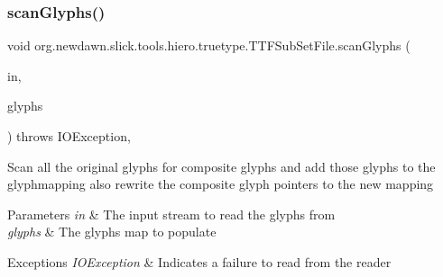 \mbox{\label{classorg_1_1newdawn_1_1slick_1_1tools_1_1hiero_1_1truetype_1_1_t_t_f_sub_set_file_ac6b4665aa19603c6718a9153d3bcab5c}} 
\subsubsection{\texorpdfstring{scan\+Glyphs()}{scanGlyphs()}}
{\footnotesize\ttfamily void org.\+newdawn.\+slick.\+tools.\+hiero.\+truetype.\+T\+T\+F\+Sub\+Set\+File.\+scan\+Glyphs (\begin{DoxyParamCaption}\item[{\mbox{\hyperlink{classorg_1_1newdawn_1_1slick_1_1tools_1_1hiero_1_1truetype_1_1_font_file_reader}{Font\+File\+Reader}}}]{in,  }\item[{Map}]{glyphs }\end{DoxyParamCaption}) throws I\+O\+Exception\hspace{0.3cm}{\ttfamily [inline]}, {\ttfamily [private]}}

Scan all the original glyphs for composite glyphs and add those glyphs to the glyphmapping also rewrite the composite glyph pointers to the new mapping


\begin{DoxyParams}{Parameters}
{\em in} & The input stream to read the glyphs from \\
\hline
{\em glyphs} & The glyphs map to populate \\
\hline
\end{DoxyParams}

\begin{DoxyExceptions}{Exceptions}
{\em I\+O\+Exception} & Indicates a failure to read from the reader \\
\hline
\end{DoxyExceptions}

